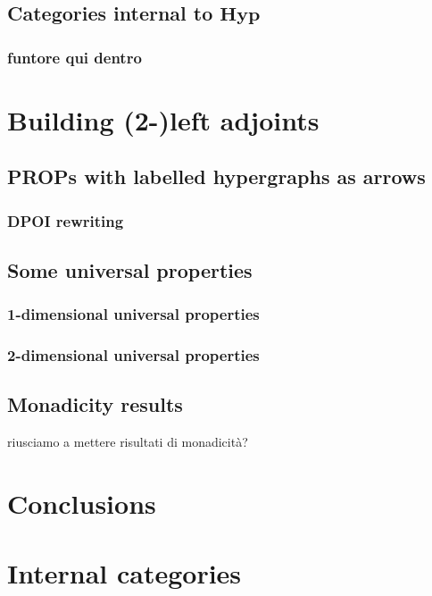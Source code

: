 \documentclass[a4paper,UKenglish,cleveref,pdftex,thm-restate,numberwithinsect]{lipics-v2021}
\newcommand{\cat}[1]{\ensuremath{\mathbf{#1}}}
\newcommand{\hyp}{\cat{Hyp}}
\begin{document}
\subsection{Categories internal to $\hyp$}

\subsubsection{funtore qui dentro}

\section{Building (2-)left adjoints}

\subsection{PROPs with labelled hypergraphs as arrows}

\subsubsection{DPOI rewriting}
\subsection{Some universal properties}

\subsubsection{1-dimensional universal properties}

\subsubsection{2-dimensional universal properties}

\subsection{Monadicity results}
riusciamo a mettere risultati di monadicità?
\section{Conclusions}
	

\appendix

\section{Internal categories}
\end{document}
